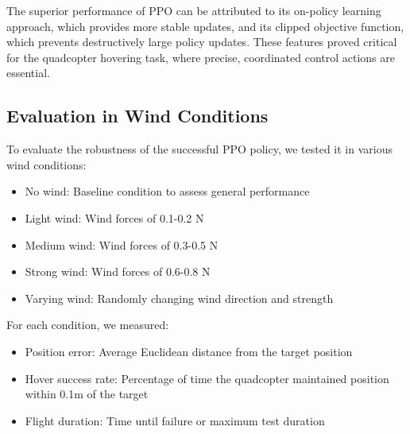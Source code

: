 \documentclass[12pt]{article}
\begin{document}
The superior performance of PPO can be attributed to its on-policy learning approach, which provides more stable updates, and its clipped objective function, which prevents destructively large policy updates. These features proved critical for the quadcopter hovering task, where precise, coordinated control actions are essential.


\subsection{Evaluation in Wind Conditions}

To evaluate the robustness of the successful PPO policy, we tested it in various wind conditions:


\begin{itemize}
    \item No wind: Baseline condition to assess general performance
    \item Light wind: Wind forces of 0.1-0.2 N
    \item Medium wind: Wind forces of 0.3-0.5 N
    \item Strong wind: Wind forces of 0.6-0.8 N
    \item Varying wind: Randomly changing wind direction and strength
\end{itemize}


For each condition, we measured:
\begin{itemize}
    \item Position error: Average Euclidean distance from the target position
    \item Hover success rate: Percentage of time the quadcopter maintained position within 0.1m of the target
    \item Flight duration: Time until failure or maximum test duration
\end{itemize}
\end{document}
